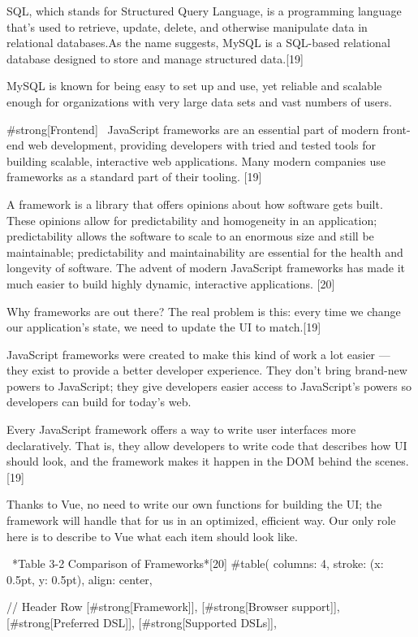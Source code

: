 SQL, which stands for Structured Query Language, is a programming language that’s used to retrieve, update, delete, and otherwise manipulate data in relational databases.As the name suggests, MySQL is a SQL-based relational database designed to store and manage structured data.[19]

MySQL is known for being easy to set up and use, yet reliable and scalable enough for organizations with very large data sets and vast numbers of users.


#strong[Frontend]
\
JavaScript frameworks are an essential part of modern front-end web development, providing developers with tried and tested tools for building scalable, interactive web applications. Many modern companies use frameworks as a standard part of their tooling. [19]

A framework is a library that offers opinions about how software gets built. These opinions allow for predictability and homogeneity in an application; predictability allows the software to scale to an enormous size and still be maintainable; predictability and maintainability are essential for the health and longevity of software. The advent of modern JavaScript frameworks has made it much easier to build highly dynamic, interactive applications. [20]

Why frameworks are out there? 
The real problem is this: every time we change our application's state, we need to update the UI to match.[19]

JavaScript frameworks were created to make this kind of work a lot easier — they exist to provide a better developer experience. They don't bring brand-new powers to JavaScript; they give developers easier access to JavaScript's powers so developers can build for today's web.

Every JavaScript framework offers a way to write user interfaces more declaratively. That is, they allow developers  to write code that describes how UI should look, and the framework makes it happen in the DOM behind the scenes.[19]

Thanks to Vue, no need to write our own functions for building the UI; the framework will handle that for us in an optimized, efficient way. Our only role here is to describe to Vue what each item should look like.
\

\
*Table 3-2 Comparison of Frameworks*[20]
#table(
  columns: 4,
  stroke: (x: 0.5pt, y: 0.5pt),
  align: center,

  // Header Row
  [#strong[Framework]],
  [#strong[Browser support]],
  [#strong[Preferred DSL]],
  [#strong[Supported DSLs]],
  


